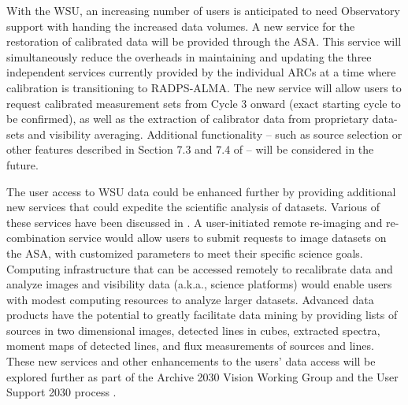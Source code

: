 With the WSU, an increasing number of users is anticipated to need Observatory support with handing the increased data volumes.  A new service for the restoration of calibrated data will be provided through the \ac{ASA}. This service will simultaneously reduce the overheads in maintaining and updating the three independent services currently provided by the individual ARCs at a time where calibration is transitioning to RADPS-ALMA. The new service will allow users to request calibrated measurement sets from Cycle 3 onward (exact starting cycle to be confirmed), as well as the extraction of calibrator data from proprietary data-sets and visibility averaging. Additional functionality -- such as source selection or other features described in Section 7.3 and 7.4 of \cite{uid} -- will be considered in the future.

The user access to WSU data could be enhanced further by providing additional new services that could expedite the scientific analysis of datasets. Various of these services have been discussed in \cite{uid}. A user-initiated remote re-imaging and re-combination service would allow users to submit requests to image datasets on the ASA, with customized parameters to meet their specific science goals. Computing infrastructure that can be accessed remotely to recalibrate data and analyze images and visibility data (a.k.a., science platforms) would enable users with modest computing resources to analyze larger datasets. Advanced data products have the potential to greatly facilitate data mining by providing lists of sources in two dimensional images, detected lines in cubes, extracted spectra, moment maps of detected lines, and flux measurements of sources and lines. These new services and other enhancements to the users' data access will be explored further as part of the Archive 2030 Vision Working Group \cite{2030_archive_vision} and the User Support 2030 process \cite{2030_user_support}.


\newpage